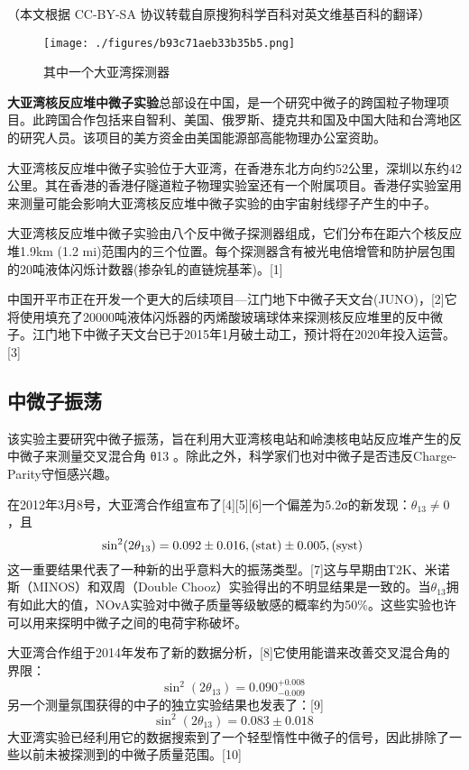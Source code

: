 
（本文根据 CC-BY-SA 协议转载自原搜狗科学百科对英文维基百科的翻译）

\begin{figure}[ht]
\centering
\texttt{[image: ./figures/b93c71aeb33b35b5.png]}
\caption{其中一个大亚湾探测器} \label{fig_DYW_1}
\end{figure}

\textbf{大亚湾核反应堆中微子实验}总部设在中国，是一个研究中微子的跨国粒子物理项目。此跨国合作包括来自智利、美国、俄罗斯、捷克共和国及中国大陆和台湾地区的研究人员。该项目的美方资金由美国能源部高能物理办公室资助。

大亚湾核反应堆中微子实验位于大亚湾，在香港东北方向约52公里，深圳以东约42公里。其在香港的香港仔隧道粒子物理实验室还有一个附属项目。香港仔实验室用来测量可能会影响大亚湾核反应堆中微子实验的由宇宙射线缪子产生的中子。

大亚湾核反应堆中微子实验由八个反中微子探测器组成，它们分布在距六个核反应堆1.9km (1.2 mi)范围内的三个位置。每个探测器含有被光电倍增管和防护层包围的20吨液体闪烁计数器(掺杂钆的直链烷基苯)。[1]

中国开平市正在开发一个更大的后续项目—江门地下中微子天文台(JUNO)，[2]它将使用填充了20000吨液体闪烁器的丙烯酸玻璃球体来探测核反应堆里的反中微子。江门地下中微子天文台已于2015年1月破土动工，预计将在2020年投入运营。[3]

\subsection{中微子振荡}
该实验主要研究中微子振荡，旨在利用大亚湾核电站和岭澳核电站反应堆产生的反中微子来测量交叉混合角 θ13 。除此之外，科学家们也对中微子是否违反Charge-Parity守恒感兴趣。

在2012年3月8号，大亚湾合作组宣布了[4][5][6]一个偏差为5.2σ的新发现：$\theta_{13} \neq 0$，且
$$\sin^2(2 \theta_{13}) = 0.092 \pm 0.016 \\, (\text{stat}) \pm 0.005 \\, (\text{syst})~$$
这一重要结果代表了一种新的出乎意料大的振荡类型。[7]这与早期由T2K、米诺斯（MINOS）和双周（Double Chooz）实验得出的不明显结果是一致的。当$\theta_{13}$拥有如此大的值，NOνA实验对中微子质量等级敏感的概率约为50\%。这些实验也许可以用来探明中微子之间的电荷宇称破坏。

大亚湾合作组于2014年发布了新的数据分析，[8]它使用能谱来改善交叉混合角的界限：
$$\sin^2(2 \theta_{13}) = 0.090^{+0.008}_{-0.009}~$$
另一个测量氛围获得的中子的独立实验结果也发表了：[9]
$$\sin^2(2 \theta_{13}) = 0.083 \pm 0.018~$$
大亚湾实验已经利用它的数据搜索到了一个轻型惰性中微子的信号，因此排除了一些以前未被探测到的中微子质量范围。[10]

